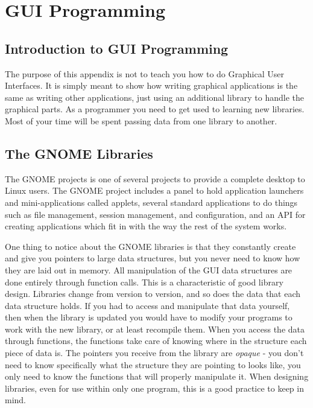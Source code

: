 \chapter{GUI Programming}

% 
% 
% 
% 

\section{Introduction to GUI Programming}

The purpose of this appendix is not to teach you how to
do Graphical User Interfaces.  It is simply meant to show
how writing graphical applications is the same as writing
other applications, just using an additional library to
handle the graphical parts.  As a programmer you need
to get used to learning new libraries.  Most of your time
will be spent passing data from one library to another.

\section{The GNOME Libraries}

The GNOME projects is one of several projects to provide
a complete desktop to Linux users.  The GNOME project includes
a panel to hold application launchers and mini-applications
called applets, several standard applications to do things
such as file management, session management, and configuration,
and an API for creating applications which fit in with the
way the rest of the system works.

One thing to notice about the GNOME libraries is that they
constantly create and give you pointers to large data 
structures, but you never need to know how they are laid
out in memory.  All manipulation of the GUI data structures
are done entirely through function calls.  This is a 
characteristic of good library design.  Libraries change
from version to version, and so does the data that each
data structure holds.  If you had to access and manipulate
that data yourself, then when the library is updated you
would have to modify your programs to work with the new library,
or at least recompile them.  When you access the data through
functions, the functions take care of knowing where in the
structure each piece of data is.  The pointers you receive
from the library are \emph{opaque} - you don't
need to know specifically what the structure they are pointing
to looks like, you only need to know the functions that will
properly manipulate it.  When designing libraries, even for
use within only one program, this is a good practice to keep
in mind.

